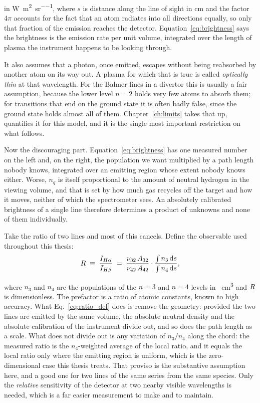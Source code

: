 \noindent in \si{\watt\per\square\metre\per\steradian}, where $s$ is distance
along the line of sight in \si{\centi\metre} and the factor $4\pi$ accounts for
the fact that an atom radiates into all directions equally, so only that fraction
of the emission reaches the detector. Equation~\eqref{eq:brightness} says the
brightness is the emission rate per unit volume, integrated over the length of
plasma the instrument happens to be looking through.

It also assumes that a photon, once emitted, escapes without being reabsorbed by
another atom on its way out. A plasma for which that is true is called
\emph{optically thin} at that wavelength. For the Balmer lines in a divertor this
is usually a fair assumption, because the lower level $n=2$ holds very few atoms
to absorb them; for transitions that end on the ground state it is often badly
false, since the ground state holds almost all of them. Chapter~\ref{ch:limits}
takes that up, quantifies it for this model, and it is the single most important
restriction on what follows.

Now the discouraging part. Equation~\eqref{eq:brightness} has one measured number
on the left and, on the right, the population we want multiplied by a path length
nobody knows, integrated over an emitting region whose extent nobody knows
either. Worse, $n_q$ is itself proportional to the amount of neutral hydrogen in
the viewing volume, and that is set by how much gas recycles off the target and
how it moves, neither of which the spectrometer sees. An absolutely calibrated
brightness of a single line therefore determines a product of unknowns and none
of them individually.

Take the ratio of two lines and most of this cancels. Define the observable used
throughout this thesis:
\begin{equation}
  R \;\equiv\; \frac{I_{H\alpha}}{I_{H\beta}}
        \;=\; \frac{\nu_{32}\,A_{32}}{\nu_{42}\,A_{42}}
              \cdot\frac{\int n_3\,\mathrm{d}s}{\int n_4\,\mathrm{d}s},
  \label{eq:ratio_def}
\end{equation}

\noindent where $n_3$ and $n_4$ are the populations of the $n=3$ and $n=4$
levels in \si{\per\cubic\centi\metre} and $R$ is dimensionless. The
prefactor is a ratio of atomic constants, known to high accuracy. What
Eq.~\eqref{eq:ratio_def} does is remove the geometry: provided the two lines are
emitted by the same volume, the absolute neutral density and the absolute
calibration of the instrument divide out, and so does the path length as a
scale. What does not divide out is any variation of $n_3/n_4$ along the chord:
the measured ratio is the $n_4$-weighted average of the local ratio, and it
equals the local ratio only where the emitting region is uniform, which is the
zero-dimensional case this thesis treats. That proviso is the substantive assumption here, and a good one for
two lines of the same series from the same species. Only the \emph{relative}
sensitivity of the detector at two nearby visible wavelengths is needed, which is
a far easier measurement to make and to maintain.

